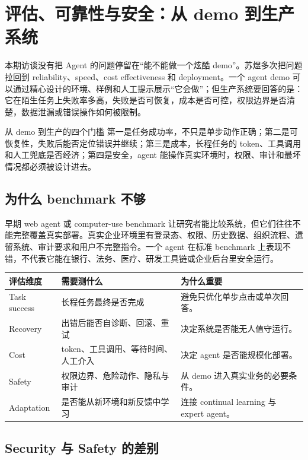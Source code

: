\section{评估、可靠性与安全：从 demo 到生产系统}

本期访谈没有把 Agent 的问题停留在“能不能做一个炫酷 demo”。苏煜多次把问题拉回到 reliability、speed、cost effectiveness 和 deployment。一个 agent demo 可以通过精心设计的环境、样例和人工提示展示“它会做”；但生产系统要回答的是：它在陌生任务上失败率多高，失败是否可恢复，成本是否可控，权限边界是否清楚，数据泄漏或错误操作如何被限制。

\begin{importantbox}{从 demo 到生产的四个门槛}
第一是任务成功率，不只是单步动作正确；第二是可恢复性，失败后能否定位错误并继续；第三是成本，长程任务的 token、工具调用和人工兜底是否经济；第四是安全，agent 能操作真实环境时，权限、审计和最坏情况都必须被设计进去。
\end{importantbox}

\subsection{为什么 benchmark 不够}

早期 web agent 或 computer-use benchmark 让研究者能比较系统，但它们往往不能完整覆盖真实部署。真实企业环境里有登录态、权限、历史数据、组织流程、遗留系统、审计要求和用户不完整指令。一个 agent 在标准 benchmark 上表现不错，不代表它能在银行、法务、医疗、研发工具链或企业后台里安全运行。

\noindent\begin{tabularx}{\textwidth}{p{}p{}X}
\toprule
评估维度 & 需要测什么 & 为什么重要 \\
\midrule
Task success & 长程任务最终是否完成 & 避免只优化单步点击或单次回答。 \\
Recovery & 出错后能否自诊断、回滚、重试 & 决定系统是否能无人值守运行。 \\
Cost & token、工具调用、等待时间、人工介入 & 决定 agent 是否能规模化部署。 \\
Safety & 权限边界、危险动作、隐私与审计 & 从 demo 进入真实业务的必要条件。 \\
Adaptation & 是否能从新环境和新反馈中学习 & 连接 continual learning 与 expert agent。 \\
\bottomrule
\end{tabularx}

\subsection{Security 与 Safety 的差别}

